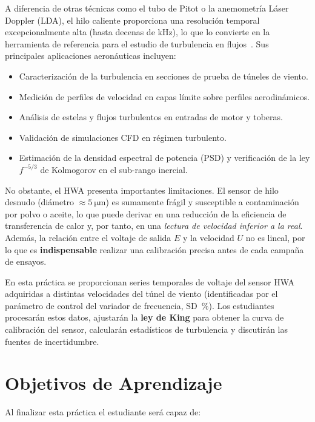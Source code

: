 \documentclass[12pt,a4paper]{article}
\begin{document}
A diferencia de otras técnicas como el tubo de Pitot o la anemometría Láser
Doppler (LDA), el hilo caliente proporciona una resolución temporal
excepcionalmente alta (hasta decenas de \si{\kHz}), lo que lo convierte en
la herramienta de referencia para el estudio de turbulencia en
flujos~\cite{pope2000}.  Sus principales aplicaciones aeronáuticas incluyen:

\begin{itemize}
	\item Caracterización de la turbulencia en secciones de prueba de túneles
	      de viento.
	\item Medición de perfiles de velocidad en capas límite sobre perfiles
	      aerodinámicos.
	\item Análisis de estelas y flujos turbulentos en entradas de motor y
	      toberas.
	\item Validación de simulaciones CFD en régimen turbulento.
	\item Estimación de la densidad espectral de potencia (PSD) y verificación
	      de la ley $f^{-5/3}$ de Kolmogorov en el sub-rango inercial.
\end{itemize}

No obstante, el HWA presenta importantes limitaciones.  El sensor de hilo
desnudo (diámetro $\approx\SI{5}{\micro\m}$) es sumamente frágil y
susceptible a contaminación por polvo o aceite, lo que puede derivar en una
reducción de la eficiencia de transferencia de calor y, por tanto, en una
\emph{lectura de velocidad inferior a la real}.  Además, la relación entre
el voltaje de salida $E$ y la velocidad $U$ no es lineal, por lo que es
\textbf{indispensable} realizar una calibración precisa antes de cada
campaña de ensayos.

En esta práctica se proporcionan series temporales de voltaje del sensor
HWA adquiridas a distintas velocidades del túnel de viento (identificadas
por el parámetro de control del variador de frecuencia, SD~\%).  Los
estudiantes procesarán estos datos, ajustarán la \textbf{ley de King} para
obtener la curva de calibración del sensor, calcularán estadísticos de
turbulencia y discutirán las fuentes de incertidumbre.

\section{Objetivos de Aprendizaje}
\label{sec:objetivos}

Al finalizar esta práctica el estudiante será capaz de:
\end{document}
